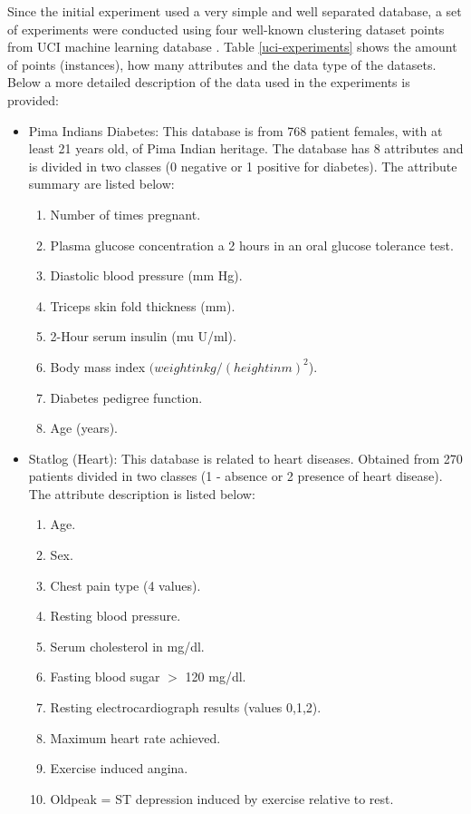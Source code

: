 \documentclass[journal]{IEEEtran}
\begin{document}
Since the initial experiment used a very simple and well separated database, a set of experiments were conducted using  four well-known clustering dataset points from UCI machine learning database \cite{uci}. Table \ref{uci-experiments} shows the amount of points (instances), how many attributes and the data type of the datasets. Below a more detailed description of the data used in the experiments is provided:

\begin{itemize}
	\item Pima Indians Diabetes: This database is from 768 patient females, with at least 21 years old, of Pima Indian heritage. The database has 8 attributes and is divided in two classes (0 negative or 1 positive for diabetes). The attribute summary are listed below:
	\begin{enumerate}
		\item Number of times pregnant.
		\item Plasma glucose concentration a 2 hours in an oral glucose tolerance test.
		\item  Diastolic blood pressure (mm Hg).
		\item  Triceps skin fold thickness (mm).
		\item  2-Hour serum insulin (mu U/ml).
		\item Body mass index $(weight in kg/(height in m)^2$).
		\item Diabetes pedigree function.
		\item Age (years).
	\end{enumerate}
	\item Statlog (Heart): This database is related to heart diseases. Obtained from 270 patients divided in two classes (1 - absence or 2 presence of heart disease). The attribute description is listed below:
	\begin{enumerate}
		\item Age.
		\item Sex.
		\item Chest pain type (4 values).
		\item Resting blood pressure.
		\item Serum cholesterol in mg/dl. 
		\item Fasting blood sugar $>$ 120 mg/dl.
		\item Resting electrocardiograph results (values 0,1,2).
		\item Maximum heart rate achieved.
		\item Exercise induced angina.
		\item Oldpeak = ST depression induced by exercise relative to rest.

\end{enumerate}
\end{itemize}
\end{document}
